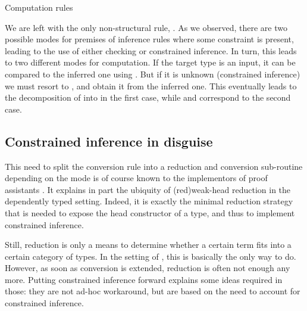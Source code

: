 \begin{marginfigure}
\ContinuedFloat
{}
\caption{Computation rules}
\end{marginfigure}

We are left with the only non-structural rule, .
As we observed, there are two possible modes for premises of inference rules where some
constraint is present, leading to the use of either checking or constrained inference.
In turn, this leads to two different modes for computation.
If the target type is an input, it can be compared to the inferred one using .
But if it is unknown (constrained inference) we must resort to ,
and obtain it from the inferred one.
This eventually leads to the decomposition of  into
 in the first case, while
 and  correspond to the second case.

\subsection{Constrained inference in disguise}

This need to split the conversion rule into a reduction and conversion sub-routine depending on the mode is of course known to the implementors of proof assistants .
It explains in part the ubiquity of \kl(red){weak-head} reduction
in the dependently typed setting.
Indeed, it is exactly the minimal reduction strategy that is needed to expose the
head constructor of a type, and thus to implement constrained inference.

Still, reduction is only a means to determine whether a certain term fits into a certain category of types. In the setting of , this is basically the only way to do.
However, as soon as conversion is extended,
reduction is often not enough any more.
Putting constrained inference forward explains some ideas required in those: 
they are not ad-hoc workaround, but are based on the need to account for constrained inference.

